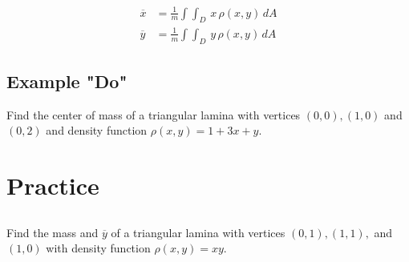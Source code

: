 \documentclass[11pt,letterpaper]{article}
\newif\ifshowsolutions
\newcommand{\sol}[1]{%
  \ifshowsolutions
  {\color{red}#1}%
  \fi
}
\begin{document}
\begin{align*}
    \overline{x}&=\frac{1}{m}\int\int_D \, x \, \rho(x,y) \, dA\\
    \overline{y}&=\frac{1}{m}\int\int_D \, y \, \rho(x,y) \, dA
\end{align*}


\subsection{Example "Do"}

Find the center of mass of a triangular lamina with vertices $(0,0),(1,0)$ and $(0,2)$ and density function $\rho(x,y)=1+3x+y$.

\sol{%
\textbf{Solution.}
From the previous example, $m=\dfrac{8}{3}$ and $0\le x\le 1$, $0\le y\le 2-2x$.

\textbf{Step 1 ($M_y$, moment about the $y$-axis).}
\[
M_y=\int_0^1\int_0^{2-2x}x(1+3x+y)\,dy\,dx
=\int_0^1 x\left[\int_0^{2-2x}(1+3x+y)\,dy\right]dx
=\int_0^1 x(4-4x^2)\,dx.
\]
\[
M_y=\int_0^1(4x-4x^3)\,dx
=\left[2x^2-x^4\right]_0^1=2-1=1.
\]
So $\displaystyle\overline{x}=\frac{M_y}{m}=\frac{1}{8/3}=\boxed{\frac{3}{8}}$.

\textbf{Step 2 ($M_x$, moment about the $x$-axis).}
\[
M_x=\int_0^1\int_0^{2-2x}y(1+3x+y)\,dy\,dx.
\]
Inner: $\displaystyle\int y(1+3x+y)\,dy=\frac{y^2}{2}+\frac{3xy^2}{2}+\frac{y^3}{3}$.
At $y=2-2x$, with $t=2-2x$:
\[
\frac{t^2}{2}+\frac{3xt^2}{2}+\frac{t^3}{3}
=(1-x)^2\bigl(2+6x\bigr)+\frac{8(1-x)^3}{3}.
\]
Integrate from $0$ to $1$:
\[
\int_0^1(1-x)^2(2+6x)\,dx+\frac{8}{3}\int_0^1(1-x)^3\,dx
=\frac{7}{6}+\frac{2}{3}=\frac{11}{6}.
\]
So $\displaystyle\overline{y}=\frac{M_x}{m}=\frac{11/6}{8/3}=\frac{11}{6}\cdot\frac{3}{8}=\boxed{\frac{11}{16}}$.

\textbf{Answer:} $\displaystyle\left(\overline{x},\overline{y}\right)=\left(\frac{3}{8},\frac{11}{16}\right)$.
}

\vfill 

\pagebreak

\section{Practice}

\subsection{}

Find the mass and $\overline{y}$ of a triangular lamina with vertices $(0,1),(1,1),$ and $(1,0)$ with density function $\rho(x,y)=xy$.
\end{document}
